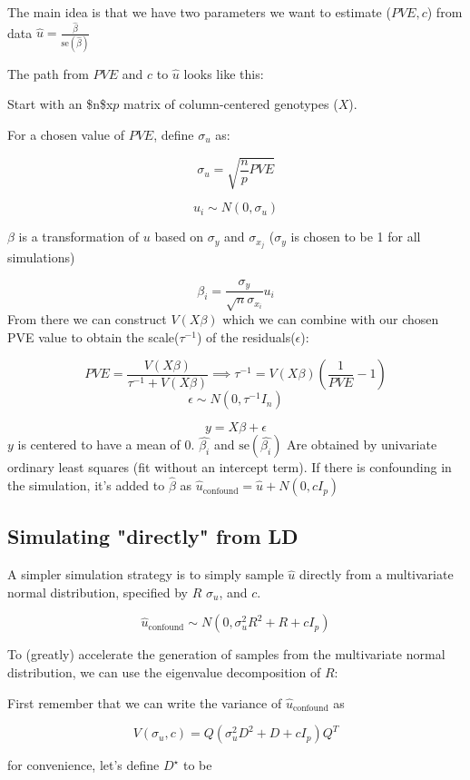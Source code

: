 {The main idea is that we have two parameters we want to estimate (\(PVE,c\)) from data \(\hat{u}=\frac{\hat{\beta}}{\text{se}(\hat{\beta})}\)

The path from \(PVE\) and \(c\)  to \(\hat{u}\) looks like this:

Start with an \$n\$x\(p\) matrix of column-centered genotypes (\(X\)).

For a chosen value of \(PVE\), define \(\sigma_u\) as:

$$\sigma_u=\sqrt{\frac{n}{p}PVE}$$

$$u_i \sim N(0,\sigma_u)$$

\(\beta\) is a transformation of \(u\) based on \(\sigma_y\) and \(\sigma_{x_j}\) (\(\sigma_y\) is chosen to be 1 for all simulations)


$$\beta_i=\frac{\sigma_y}{\sqrt{n}\sigma_{x_i}} u_i$$
From there we can construct \(V(X\beta)\) which we can combine with our chosen PVE value to obtain the scale(\(\tau^{-1}\)) of the residuals(\(\epsilon\)):

$$ PVE= \frac{V(X\beta)}{\tau^{-1} + V(X\beta)} \implies \tau^{-1} = V(X\beta) \left(\frac{1}{PVE}-1\right)  $$
$$\epsilon \sim N(0,\tau^{-1}I_n)$$


$$ y= X \beta + \epsilon $$
\(y\) is centered to have a mean of \(0\). \(\hat{\beta_i}\) and \(\text{se}(\hat{\beta_i})\) Are obtained by univariate ordinary least squares (fit without an intercept term). If there is confounding in the simulation, it's added to \(\hat{\beta}\) as \(\hat{u}_{\text{confound}}=\hat{u}+N(0,c I_p)\)


\subsection{Simulating "directly" from LD}\label{sec:org40b8379}

A simpler simulation strategy is to simply sample \(\hat{u}\) directly from a multivariate normal distribution, specified by \(R\) \(\sigma_u\), and \(c\).


$$\hat{u}_{\text{confound}} \sim N(0,\sigma_u^2R^2+R+c I_p)$$

To (greatly) accelerate the generation of samples from the multivariate normal distribution, we can use the eigenvalue decomposition of \(R\):

First remember that we can write the variance of \(\hat{u}_{\text{confound}}\) as 

$$V(\sigma_u,c)=Q(\sigma^2_uD^2+D+c I_p)Q^{T}$$

for convenience, let's define \(D^\star\) to be 

}
